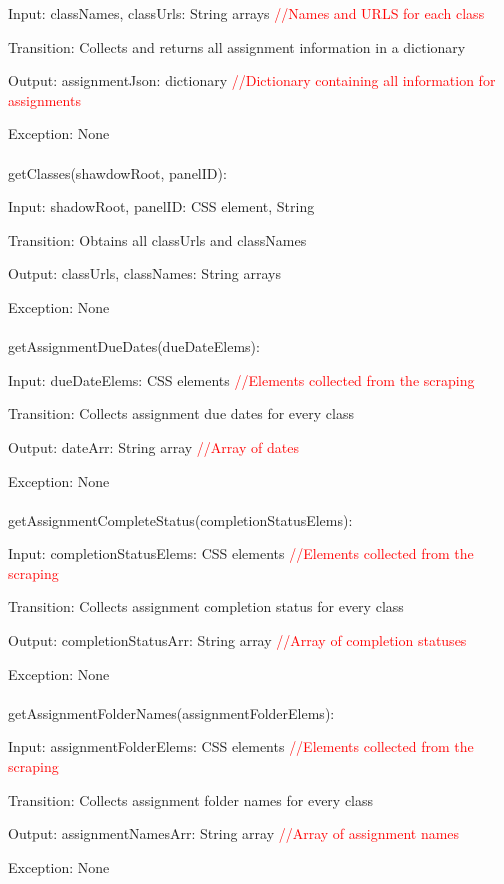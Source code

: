 \documentclass[12pt, titlepage]{article}
\begin{document}
    Input: classNames, classUrls: String arrays \textcolor{red}{//Names and URLS for each class}

    Transition: Collects and returns all assignment information in a dictionary

    Output: assignmentJson: dictionary \textcolor{red}{//Dictionary containing all information for assignments}

    Exception: None
\\
\\
getClasses(shawdowRoot, panelID):

    Input: shadowRoot, panelID: CSS element, String

    Transition: Obtains all classUrls and classNames

    Output: classUrls, classNames: String arrays

    Exception: None
\\
\\
getAssignmentDueDates(dueDateElems):

    Input: dueDateElems: CSS elements \textcolor{red}{//Elements collected from the scraping}

    Transition: Collects assignment due dates for every class

    Output: dateArr: String array \textcolor{red}{//Array of dates}

    Exception: None
\\
\\
getAssignmentCompleteStatus(completionStatusElems):

    Input: completionStatusElems: CSS elements \textcolor{red}{//Elements collected from the scraping}

    Transition: Collects assignment completion status for every class

    Output: completionStatusArr: String array \textcolor{red}{//Array of completion statuses}

    Exception: None
\\
\\
getAssignmentFolderNames(assignmentFolderElems):

    Input: assignmentFolderElems: CSS elements \textcolor{red}{//Elements collected from the scraping}

    Transition: Collects assignment folder names for every class

    Output: assignmentNamesArr: String array \textcolor{red}{//Array of assignment names}
    
    Exception: None
\end{document}
